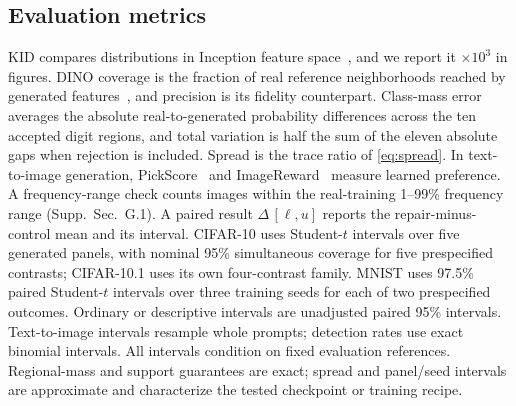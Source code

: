 \subsection{Evaluation metrics}
\label{sec:metrics}
KID compares distributions in Inception feature
space~\cite{binkowski2018demystifying}, and we report it $\times10^3$ in
figures. DINO coverage is the fraction of real reference neighborhoods
reached by generated features~\cite{naeem2020density}, and precision is
its fidelity counterpart. Class-mass error averages the absolute
real-to-generated probability differences across the ten accepted digit
regions, and total variation is half the sum of the eleven absolute gaps
when rejection is included. Spread is the trace ratio of
\cref{eq:spread}. In text-to-image generation, PickScore~\cite{kirstain2023pickapic}
and ImageReward~\cite{xu2023imagereward} measure learned preference. A frequency-range check
counts images within the real-training 1--99\% frequency range
(Supp.~Sec.~G.1). A paired result $\Delta\,[\ell,u]$ reports the repair-minus-control mean
and its interval. CIFAR-10 uses Student-$t$ intervals over five generated
panels, with nominal 95\% simultaneous coverage for five prespecified
contrasts; CIFAR-10.1 uses its own four-contrast family. MNIST uses 97.5\%
paired Student-$t$ intervals over three training seeds for each of two
prespecified outcomes. Ordinary or descriptive intervals are unadjusted
paired 95\% intervals. Text-to-image intervals resample whole prompts;
detection rates use exact binomial intervals. All intervals condition on
fixed evaluation references. Regional-mass and support guarantees are
exact; spread and panel/seed intervals are approximate and characterize
the tested checkpoint or training recipe.
